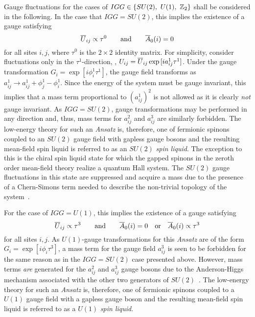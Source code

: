 Gauge fluctuations for the cases of $IGG \in \{SU(2),~U(1),~\mathbb{Z}_{2}\}$ shall be considered in the following.
In the case that $IGG = SU(2)$, this implies the existence of a gauge satisfying
%
\begin{equation}
	\overline{U}_{ij} \propto \tau^0 \qquad {\rm and } \qquad \overline{A}_0(i) = 0
\end{equation}
%
for all sites $i,j$, where $\tau^0$ is the $2\times 2$ identity matrix.
For simplicity, consider fluctuations only in the $\tau^1$-direction, \ie, $U_{ij} = \overline{U}_{ij} \exp{[i a^1_{ij} \tau^1]}$.
Under the gauge transformation $G_i = \exp{[i \phi^1_i \tau^1]}$, the gauge field transforms as $a^1_{ij} \rightarrow a^1_{ij} + \phi^1_j - \phi^1_i$.
Since the energy of the system must be gauge invariant, this implies that a mass term proportional to $(a^1_{ij})^2$ is not allowed as it is clearly \textit{not} gauge invariant.
As $IGG = SU(2)$, gauge transformations may be performed in any direction and, thus, mass terms for $a^2_{ij}$ and $a^3_{ij}$ are similarly forbidden.
The low-energy theory for such an \textit{Ansatz} is, therefore, one of fermionic spinons coupled to an $SU(2)$ gauge field with gapless gauge bosons and the resulting mean-field spin liquid is referred to as an $SU(2)$ \textit{spin liquid}.
The exception to this is the chiral spin liquid state for which the gapped spinons in the zeroth order mean-field theory realize a quantum Hall system.
The $SU(2)$ gauge fluctuations in this state are suppressed and acquire a mass due to the presence of a Chern-Simons term needed to describe the non-trivial topology of the system~\cite{KalmeyerPRL1987,WenPRB1989b}.

For the case of $IGG = U(1)$, this implies the existence of a gauge satisfying
%
\begin{equation}
	\overline{U}_{ij} \propto \tau^3 \qquad {\rm and } \qquad \overline{A}_0(i) = 0 \quad {\rm or } \quad \overline{A}_0(i) \propto \tau^3
\end{equation}
%
for all sites $i,j$.
As $U(1)$-gauge transformations for this \textit{Ansatz} are of the form $G_i = \exp{[i \phi_i \tau^3]}$, a mass term for the gauge field $a^3_{ij}$ is seen to be forbidden for the same reason as in the $IGG = SU(2)$ case presented above.
However, mass terms \textit{are} generated for the $a^2_{ij}$ and $a^3_{ij}$ gauge bosons due to the Anderson-Higgs mechanism associated with the other two generators of $SU(2)$~\cite{WenPRB1991,WenPRB2002,Wen2004}.
The low-energy theory for such an \textit{Ansatz} is, therefore, one of fermionic spinons coupled to a $U(1)$ gauge field with a gapless gauge boson and the resulting mean-field spin liquid is referred to as a $U(1)$ \textit{spin liquid}.


